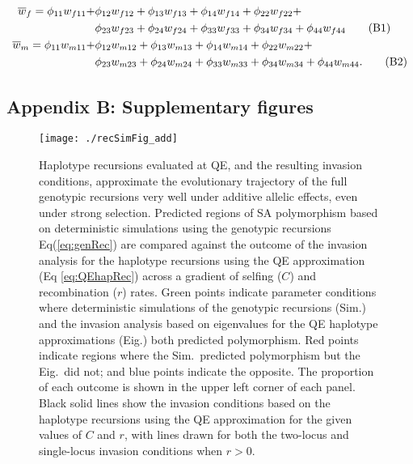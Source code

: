 \documentclass{article}
\newcommand\numberthis{\addtocounter{equation}{1}\tag{\theequation}}
\begin{document}
\begin{align*}
	\overline{w}_f = \phi_{11} w_{f11} + &\phi_{12} w_{f12} + \phi_{13} w_{f13} + \phi_{14} w_{f14} + \phi_{22} w_{f22} + \\ 
				     &\phi_{23} w_{f23} + \phi_{24} w_{f24} + \phi_{33} w_{f33} + \phi_{34} w_{f34} + \phi_{44} w_{f44} \numberthis \\
	\overline{w}_m = \phi_{11} w_{m11} + &\phi_{12} w_{m12} + \phi_{13} w_{m13} + \phi_{14} w_{m14} + \phi_{22} w_{m22} + \\
				     &\phi_{23} w_{m23} + \phi_{24} w_{m24} + \phi_{33} w_{m33} + \phi_{34} w_{m34} + \phi_{44} w_{m44}. \numberthis
\end{align*}





\subsection*{Appendix B: Supplementary figures}
\renewcommand{\theequation}{B\arabic{equation}}
\setcounter{equation}{0}
\renewcommand{\thefigure}{B\arabic{figure}}
\setcounter{figure}{0}

\begin{figure}[H]
\texttt{[image: ./recSimFig\_add]}
\caption{Haplotype recursions evaluated at QE, and the resulting invasion conditions, approximate the evolutionary trajectory of the full genotypic recursions very well under additive allelic effects, even under strong selection. Predicted regions of SA polymorphism based on deterministic simulations using the genotypic recursions Eq(\ref{eq:genRec}) are compared against the outcome of the invasion analysis for the haplotype recursions using the QE approximation (Eq \ref{eq:QEhapRec}) across a gradient of selfing ($C$) and recombination ($r$) rates. Green points indicate parameter conditions where deterministic simulations of the genotypic recursions (Sim.) and the invasion analysis based on eigenvalues for the QE haplotype approximations (Eig.) both predicted polymorphism. Red points indicate regions where the Sim.~predicted polymorphism but the Eig.~did not; and blue points indicate the opposite. The proportion of each outcome is shown in the upper left corner of each panel. Black solid lines show the invasion conditions based on the haplotype recursions using the QE approximation for the given values of $C$ and $r$, with lines drawn for both the two-locus and single-locus invasion conditions when $r > 0$.}
\label{fig:addSim}
\end{figure}
\newpage{}
\end{document}
